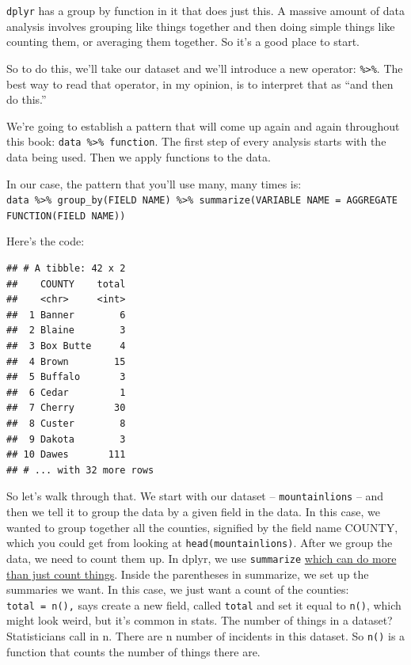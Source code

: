 \documentclass[]{book}
\newenvironment{Shaded}{\begin{snugshade}}{\end{snugshade}}
\newcommand{\DataTypeTok}[1]{\textcolor[rgb]{0.13,0.29,0.53}{#1}}
\newcommand{\KeywordTok}[1]{\textcolor[rgb]{0.13,0.29,0.53}{\textbf{#1}}}
\newcommand{\NormalTok}[1]{#1}
\newcommand{\OperatorTok}[1]{\textcolor[rgb]{0.81,0.36,0.00}{\textbf{#1}}}
\newcommand{\StringTok}[1]{\textcolor[rgb]{0.31,0.60,0.02}{#1}}
\begin{document}
\texttt{dplyr} has a group by function in it that does just this. A massive amount of data analysis involves grouping like things together and then doing simple things like counting them, or averaging them together. So it's a good place to start.

So to do this, we'll take our dataset and we'll introduce a new operator: \texttt{\%\textgreater{}\%}. The best way to read that operator, in my opinion, is to interpret that as ``and then do this.''

We're going to establish a pattern that will come up again and again throughout this book: \texttt{data\ \%\textgreater{}\%\ function}. The first step of every analysis starts with the data being used. Then we apply functions to the data.

In our case, the pattern that you'll use many, many times is: \texttt{data\ \%\textgreater{}\%\ group\_by(FIELD\ NAME)\ \%\textgreater{}\%\ summarize(VARIABLE\ NAME\ =\ AGGREGATE\ FUNCTION(FIELD\ NAME))}

Here's the code:

\begin{Shaded}
\end{Shaded}

\begin{verbatim}
## # A tibble: 42 x 2
##    COUNTY    total
##    <chr>     <int>
##  1 Banner        6
##  2 Blaine        3
##  3 Box Butte     4
##  4 Brown        15
##  5 Buffalo       3
##  6 Cedar         1
##  7 Cherry       30
##  8 Custer        8
##  9 Dakota        3
## 10 Dawes       111
## # ... with 32 more rows
\end{verbatim}

So let's walk through that. We start with our dataset -- \texttt{mountainlions} -- and then we tell it to group the data by a given field in the data. In this case, we wanted to group together all the counties, signified by the field name COUNTY, which you could get from looking at \texttt{head(mountainlions)}. After we group the data, we need to count them up. In dplyr, we use \texttt{summarize} \href{http://dplyr.tidyverse.org/reference/summarise.html}{which can do more than just count things}. Inside the parentheses in summarize, we set up the summaries we want. In this case, we just want a count of the counties: \texttt{total\ =\ n(),} says create a new field, called \texttt{total} and set it equal to \texttt{n()}, which might look weird, but it's common in stats. The number of things in a dataset? Statisticians call in n. There are n number of incidents in this dataset. So \texttt{n()} is a function that counts the number of things there are.
\end{document}
